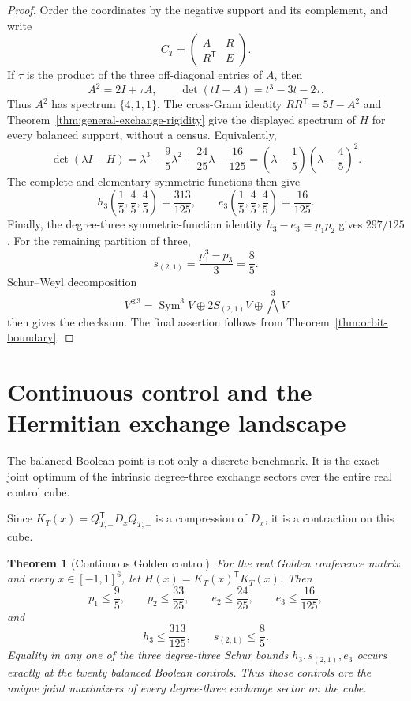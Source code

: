 \documentclass[11pt]{article}
\newtheorem{theorem}{Theorem}[section]
\theoremstyle{remark}
\newcommand{\Sym}{\operatorname{Sym}}
\begin{document}
\begin{proof}
Order the coordinates by the negative support and its complement, and write
\[
 C_T=\begin{pmatrix}A&R\\R^{\mathsf T}&E\end{pmatrix}.
\]
If \(\tau\) is the product of the three off-diagonal entries of \(A\), then
\[
 A^2=2I+\tau A,
 \qquad \det(tI-A)=t^3-3t-2\tau.
\]
Thus \(A^2\) has spectrum \(\{4,1,1\}\).  The cross-Gram identity
\(RR^{\mathsf T}=5I-A^2\) and
Theorem~\ref{thm:general-exchange-rigidity} give the displayed spectrum of
\(H\) for every balanced support, without a census.  Equivalently,
\begin{equation}
\label{eq:balanced-characteristic-polynomial}
 \det(\lambda I-H)
 =\lambda^3-\frac95\lambda^2+\frac{24}{25}\lambda-\frac{16}{125}
 =\left(\lambda-\frac15\right)\left(\lambda-\frac45\right)^2.
\end{equation}
The complete and elementary symmetric functions then give
\[
 h_3\left(\frac15,\frac45,\frac45\right)=\frac{313}{125},
 \qquad
 e_3\left(\frac15,\frac45,\frac45\right)=\frac{16}{125}.
\]
Finally, the degree-three symmetric-function identity
\(h_3-e_3=p_1p_2\) gives \(297/125\).
For the remaining partition of three,
\[
 s_{(2,1)}=\frac{p_1^3-p_3}{3}=\frac85.
\]
Schur--Weyl decomposition
\[
 V^{\otimes3}=\Sym^3V\oplus
 2S_{(2,1)}V\oplus\bigwedge^3V
\]
then gives the checksum.  The final assertion follows from
Theorem~\ref{thm:orbit-boundary}.
\end{proof}

\section{Continuous control and the Hermitian exchange landscape}

The balanced Boolean point is not only a discrete benchmark.  It is the exact
joint optimum of the intrinsic degree-three exchange sectors over the entire
real control cube.

Since \(K_T(x)=Q_{T,-}^{\mathsf T}D_xQ_{T,+}\) is a compression of
\(D_x\), it is a contraction on this cube.

\begin{theorem}[Continuous Golden control]
\label{thm:continuous-control}
For the real Golden conference matrix and every
\(x\in[-1,1]^6\), let \(H(x)=K_T(x)^{\mathsf T}K_T(x)\).  Then
\[
 p_1\le\frac95,\qquad p_2\le\frac{33}{25},\qquad
 e_2\le\frac{24}{25},\qquad e_3\le\frac{16}{125},
\]
and
\[
 h_3\le\frac{313}{125},\qquad s_{(2,1)}\le\frac85.
\]
Equality in any one of the three degree-three Schur bounds
\(h_3,s_{(2,1)},e_3\) occurs exactly at the twenty balanced Boolean controls.
Thus those controls are the unique joint maximizers of every degree-three
exchange sector on the cube.
\end{theorem}
\end{document}
